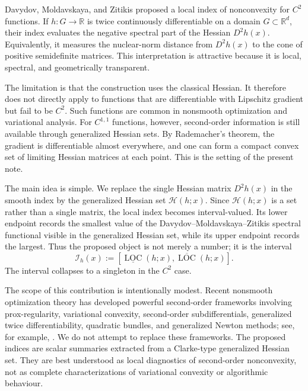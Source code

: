 \documentclass[11pt]{article}
\numberwithin{equation}{section}
\newcommand{\R}{\mathbb R}
\newcommand{\Hess}{\mathcal H}
\newcommand{\LOC}{\operatorname{LOC}}
\begin{document}
	Davydov, Moldavskaya, and Zitikis \cite{davydov2019} proposed a local index of nonconvexity for \(C^2\) functions. If \(h:G\to\R\) is twice continuously differentiable on a domain \(G\subset\R^d\), their index evaluates the negative spectral part of the Hessian \(D^2h(x)\). Equivalently, it measures the nuclear-norm distance from \(D^2h(x)\) to the cone of positive semidefinite matrices. This interpretation is attractive because it is local, spectral, and geometrically transparent.
	
	The limitation is that the construction uses the classical Hessian. It therefore does not directly apply to functions that are differentiable with Lipschitz gradient but fail to be \(C^2\). Such functions are common in nonsmooth optimization and variational analysis. For \(C^{1,1}\) functions, however, second-order information is still available through generalized Hessian sets. By Rademacher's theorem, the gradient is differentiable almost everywhere, and one can form a compact convex set of limiting Hessian matrices at each point. This is the setting of the present note.
	
	The main idea is simple. We replace the single Hessian matrix \(D^2h(x)\) in the smooth index by the generalized Hessian set \(\Hess(h;x)\). Since \(\Hess(h;x)\) is a set rather than a single matrix, the local index becomes interval-valued. Its lower endpoint records the smallest value of the Davydov--Moldavskaya--Zitikis spectral functional visible in the generalized Hessian set, while its upper endpoint records the largest. Thus the proposed object is not merely a number; it is the interval
	\[
	\mathcal I_h(x)
	:=
	\left[
	\underline{\LOC}(h;x),
	\overline{\LOC}(h;x)
	\right].
	\]
	The interval collapses to a singleton in the \(C^2\) case.
	
	The scope of this contribution is intentionally modest. Recent nonsmooth optimization theory has developed powerful second-order frameworks involving prox-regularity, variational convexity, second-order subdifferentials, generalized twice differentiability, quadratic bundles, and generalized Newton methods; see, for example, \cite{rockafellarwets1998,poliquinrockafellar1996,lewiszhang2013,khanh2023,gfrerer2025,khanh2025,khanh2024newton,khanh2026bundles}. We do not attempt to replace these frameworks. The proposed indices are scalar summaries extracted from a Clarke-type generalized Hessian set. They are best understood as local diagnostics of second-order nonconvexity, not as complete characterizations of variational convexity or algorithmic behaviour.
	
\end{document}
